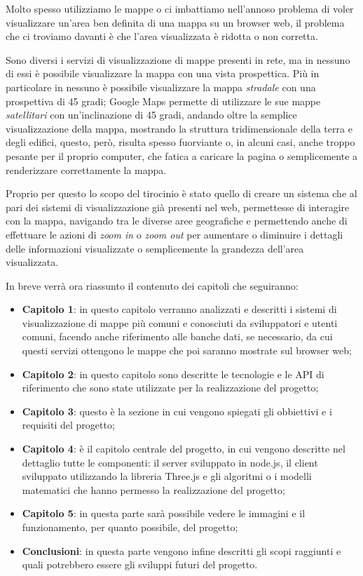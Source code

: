 Molto spesso utilizziamo le mappe o ci imbattiamo nell'annoso problema di voler visualizzare un'area ben definita di una mappa su un browser web, il problema che ci troviamo davanti è che l'area visualizzata è ridotta o non corretta. 

Sono diversi i servizi di visualizzazione di mappe presenti in rete, ma in nessuno di essi è possibile visualizzare la mappa con una vista prospettica. Più in particolare in nessuno è possibile visualizzare la mappa \textit{stradale} con una prospettiva di 45 gradi; Google Maps permette di utilizzare le sue mappe \textit{satellitari} con un'inclinazione di 45 gradi, andando oltre la semplice visualizzazione della mappa, mostrando la struttura tridimensionale della terra e degli edifici, questo, però, risulta spesso fuorviante o, in alcuni casi, anche troppo pesante per il proprio computer, che fatica a caricare la pagina o semplicemente a renderizzare correttamente la mappa.

Proprio per questo lo scopo del tirocinio è stato quello di creare un sistema che al pari dei sistemi di visualizzazione già presenti nel web, permettesse di interagire con la mappa, navigando tra le diverse aree geografiche e permettendo anche di effettuare le azioni di \textit{zoom in} o \textit{zoom out} per aumentare o diminuire i dettagli delle informazioni visualizzate o semplicemente la grandezza dell'area visualizzata.

In breve verrà ora riassunto il contenuto dei capitoli che seguiranno:
\begin{itemize}
	\item \textbf{Capitolo 1}: in questo capitolo verranno analizzati e descritti i sistemi di visualizzazione di mappe più comuni e conosciuti da sviluppatori e utenti comuni, facendo anche riferimento alle banche dati, se necessario, da cui questi servizi ottengono le mappe che poi saranno mostrate sul browser web;
	\item \textbf{Capitolo 2}: in questo capitolo sono descritte le tecnologie e le API di riferimento che sono state utilizzate per la realizzazione del progetto;
	\item \textbf{Capitolo 3}: questo è la sezione in cui vengono spiegati gli obbiettivi e i requisiti del progetto;
	\item \textbf{Capitolo 4}: è il capitolo centrale del progetto, in cui vengono descritte nel dettaglio tutte le componenti: il server sviluppato in node.js, il client sviluppato utilizzando la libreria Three.js e gli algoritmi o i modelli matematici che hanno permesso la realizzazione del progetto;
	\item \textbf{Capitolo 5}: in questa parte sarà possibile vedere le immagini e il funzionamento, per quanto possibile, del progetto;
	\item \textbf{Conclusioni}: in questa parte vengono infine descritti gli scopi raggiunti e quali potrebbero essere gli sviluppi futuri del progetto.
\end{itemize}